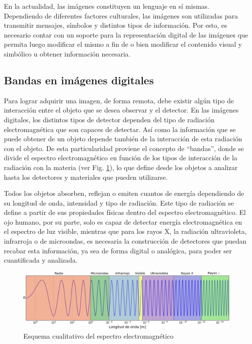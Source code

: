 En la actualidad, las imágenes constituyen un lenguaje en sí mismas. Dependiendo de diferentes factores culturales, las imágenes son utilizadas para transmitir mensajes, símbolos y distintos tipos de información. Por esto, es necesario contar con un soporte para la representación digital de las imágenes que permita luego modificar el mismo a fin de o bien modificar el contenido visual y simbólico u obtener información necesaria.

  \subsection{Bandas en imágenes digitales}
  
  Para lograr adquirir una imagen, de forma remota, debe existir algún tipo de interacción entre el objeto que se desea observar y el detector. En las imágenes digitales, los distintos tipos de detector dependen del tipo de radiación electromagnética que son capaces de detectar. Así como la información que se puede obtener de un objeto depende también de la interacción de esta radiación con el objeto. De esta particularidad proviene el concepto de ``bandas'', donde se divide el espectro electromagnético en función de los tipos de interacción de la radiación con la materia (ver Fig. \ref{fig2-1}), lo que define desde los objetos a analizar hasta los detectores y materiales que pueden utilizarse.
  
  Todos los objetos absorben, reflejan o emiten cuantos de energía dependiendo de su longitud de onda, intensidad y tipo de radiación. Este tipo de radiación se define a partir de sus propiedades físicas dentro del espectro electromagnético. El ojo humano, por su parte, solo es capaz de detectar energía electromagnética en el espectro de luz visible, mientras que para los rayos X, la radiación ultravioleta, infrarroja o de microondas, es necesaria la construcción de detectores que puedan recabar esta información, ya sea de forma digital o analógica, para poder ser cuantificada y analizada.
  
  \begin{figure}
   \centering
   \includegraphics[width=\textwidth]{figures/cap2/fig1_bandas/figure_1.png}
   \caption{Esquema cualitativo del espectro electromagnético}
   \label{fig2-1}
  \end{figure}

